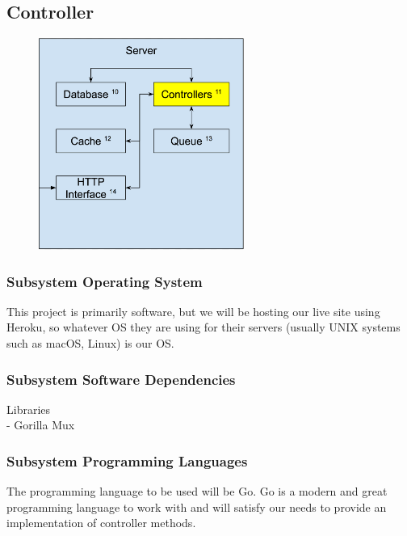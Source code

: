\subsection{Controller}

\begin{figure}[h!]
	\centering
 	\includegraphics[width=0.60\textwidth]{detailed-design-specification-latex/images/server/server_controller.png}
 \caption{}
\end{figure}

\newpage

\subsubsection{Subsystem Operating System}
This project is primarily software, but we will be hosting our live site using Heroku, so whatever OS they are using for their servers (usually UNIX systems such as macOS, Linux) is our OS. \\

\subsubsection{Subsystem Software Dependencies}
Libraries \\
- Gorilla Mux \\

\subsubsection{Subsystem Programming Languages}
The programming language to be used will be Go. Go is a modern and great programming language to work with and will satisfy our needs to provide an implementation of controller methods.

